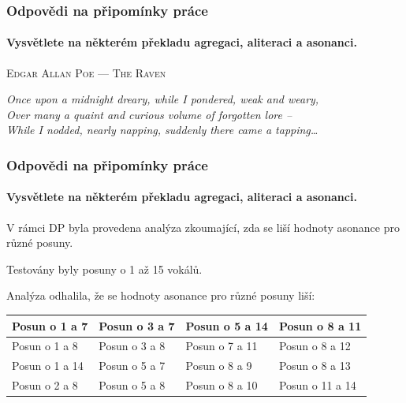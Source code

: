 \documentclass[12pt]{beamer}
\begin{document}
\begin{frame}[fragile]
	\frametitle{Odpovědi na připomínky práce}
	\framesubtitle{Vysvětlete na některém překladu agregaci, aliteraci a \textbf{asonanci}.}

	{
		\begin{center}
			\textsc{Edgar Allan Poe --- The Raven}
		
			{\small \emph{Once upon a midnight dreary, while I pondered, weak and weary,\\
		Over many a quaint and curious volume of forgotten lore --\\
		While I nodded, nearly napping, suddenly there came a tapping\ldots}}\pause
	
		\end{center}
	}
	





\end{frame}	

\begin{frame}[fragile]
	\frametitle{Odpovědi na připomínky práce}
	\framesubtitle{Vysvětlete na některém překladu agregaci, aliteraci a \textbf{asonanci}.}

	V rámci DP byla provedena analýza zkoumající, zda se liší hodnoty asonance pro různé posuny. 
	
	Testovány byly posuny o 1 až 15 vokálů. 
	
	Analýza odhalila, že se hodnoty asonance pro různé posuny liší:

	{\small \begin{tabular}{|l|l|l|l|}
		\hline Posun o 1 a 7  & Posun o 3 a 7 & Posun o 5 a 14 & Posun o 8 a 11  \\ 
		\hline Posun o 1 a 8  & Posun o 3 a 8 & Posun o 7 a 11 & Posun o 8 a 12  \\ 
		\hline Posun o 1 a 14 & Posun o 5 a 7 & Posun o 8 a 9  & Posun o 8 a 13  \\ 
		\hline Posun o 2 a 8  & Posun o 5 a 8 & Posun o 8 a 10 & Posun o 11 a 14 \\ 
		\hline 
	\end{tabular} }


\end{frame}
\end{document}
